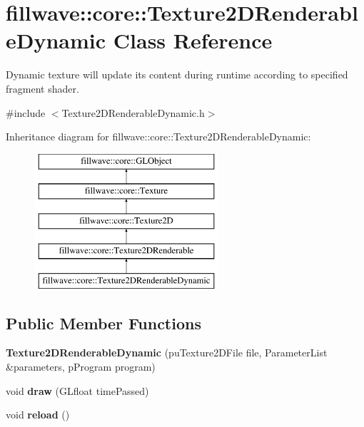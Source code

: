 \hypertarget{classfillwave_1_1core_1_1Texture2DRenderableDynamic}{}\section{fillwave\+:\+:core\+:\+:Texture2\+D\+Renderable\+Dynamic Class Reference}
\label{classfillwave_1_1core_1_1Texture2DRenderableDynamic}


Dynamic texture will update its content during runtime according to specified fragment shader.  




{\ttfamily \#include $<$Texture2\+D\+Renderable\+Dynamic.\+h$>$}

Inheritance diagram for fillwave\+:\+:core\+:\+:Texture2\+D\+Renderable\+Dynamic\+:\begin{figure}[H]
\begin{center}
\leavevmode
\includegraphics[height=5.000000cm]{classfillwave_1_1core_1_1Texture2DRenderableDynamic}
\end{center}
\end{figure}
\subsection*{Public Member Functions}
\begin{DoxyCompactItemize}
\item 
\hypertarget{classfillwave_1_1core_1_1Texture2DRenderableDynamic_a029ed54e7589b2ceca9eae53d8e542a9}{}{\bfseries Texture2\+D\+Renderable\+Dynamic} (pu\+Texture2\+D\+File file, Parameter\+List \&parameters, p\+Program program)\label{classfillwave_1_1core_1_1Texture2DRenderableDynamic_a029ed54e7589b2ceca9eae53d8e542a9}

\item 
\hypertarget{classfillwave_1_1core_1_1Texture2DRenderableDynamic_a03371a1833060693262a6fd0dad06016}{}void {\bfseries draw} (G\+Lfloat time\+Passed)\label{classfillwave_1_1core_1_1Texture2DRenderableDynamic_a03371a1833060693262a6fd0dad06016}

\item 
\hypertarget{classfillwave_1_1core_1_1Texture2DRenderableDynamic_ad7164dd408edaab2d8897836cdc4b47a}{}void {\bfseries reload} ()\label{classfillwave_1_1core_1_1Texture2DRenderableDynamic_ad7164dd408edaab2d8897836cdc4b47a}

\end{DoxyCompactItemize}
